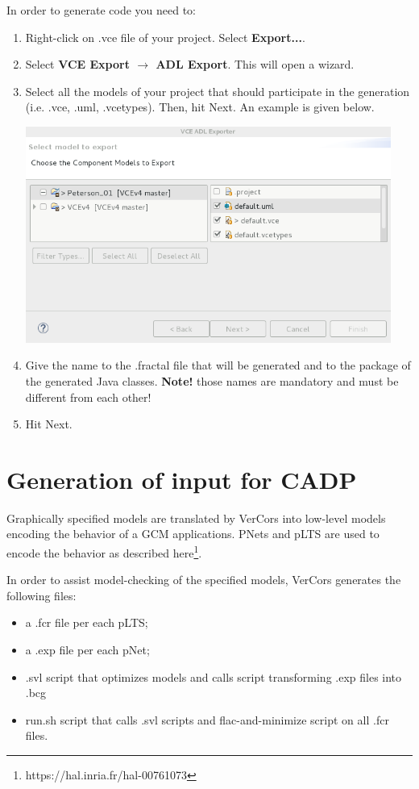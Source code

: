 \documentclass[12pt]{article}
\begin{document}
In order to generate code you need to:
\begin{enumerate}
\item
Right-click on .vce file of your project. Select \textbf{Export...}. 
\item
Select \textbf{VCE Export $\rightarrow$ ADL Export}. This will open a wizard.
\item
Select all the models of your project that should participate in the generation (i.e. .vce, .uml, .vcetypes). Then, hit Next. An example is given below.

     \centerline{
     \includegraphics[width=12cm]{draws/code-gen.png}
     \label{fig:vce-proj}
     }
     
\item
Give the name to the .fractal file that will be generated and to the package of the generated Java classes. \textbf{Note! } those names are mandatory and must be different from each other!
\item
Hit Next. 

\end{enumerate}

\section{Generation of input for CADP}

Graphically specified models are translated by VerCors into low-level models encoding the behavior of a GCM applications. PNets and pLTS are used to encode the behavior as described here\footnote{https://hal.inria.fr/hal-00761073}.

In order to assist model-checking of the specified models, VerCors generates the following files:
\begin{itemize}
\item
a .fcr file per each pLTS;
\item
a .exp file per each pNet;
\item
.svl script that optimizes models and calls script transforming .exp files into .bcg
\item
run.sh script that calls .svl scripts and flac-and-minimize script on all .fcr files.
\end{itemize}
\end{document}
